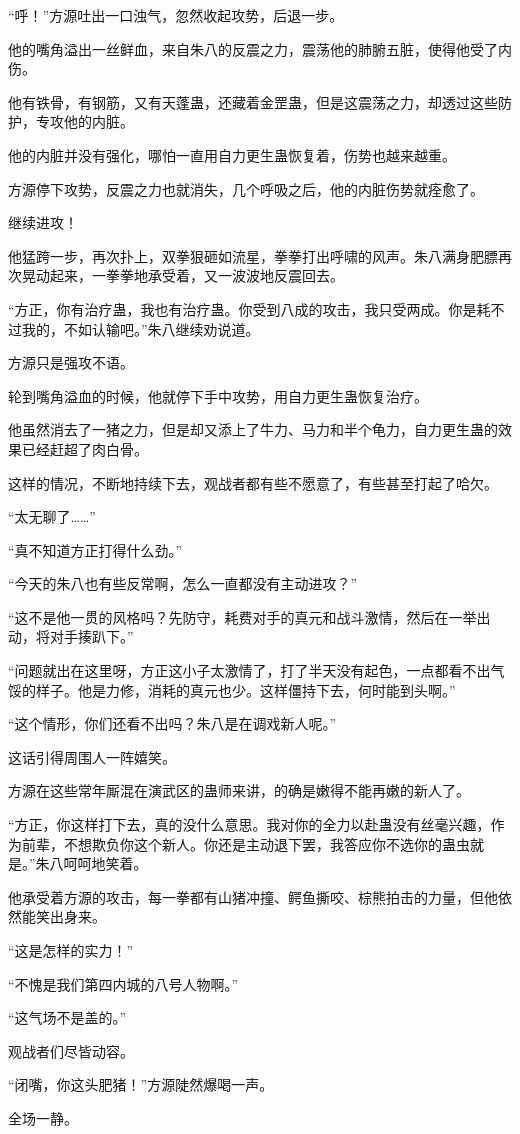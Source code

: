 \begin{this_body}
“呼！”方源吐出一口浊气，忽然收起攻势，后退一步。

他的嘴角溢出一丝鲜血，来自朱八的反震之力，震荡他的肺腑五脏，使得他受了内伤。

他有铁骨，有钢筋，又有天蓬蛊，还藏着金罡蛊，但是这震荡之力，却透过这些防护，专攻他的内脏。

他的内脏并没有强化，哪怕一直用自力更生蛊恢复着，伤势也越来越重。

方源停下攻势，反震之力也就消失，几个呼吸之后，他的内脏伤势就痊愈了。

继续进攻！

他猛跨一步，再次扑上，双拳狠砸如流星，拳拳打出呼啸的风声。朱八满身肥膘再次晃动起来，一拳拳地承受着，又一波波地反震回去。

“方正，你有治疗蛊，我也有治疗蛊。你受到八成的攻击，我只受两成。你是耗不过我的，不如认输吧。”朱八继续劝说道。

方源只是强攻不语。

轮到嘴角溢血的时候，他就停下手中攻势，用自力更生蛊恢复治疗。

他虽然消去了一猪之力，但是却又添上了牛力、马力和半个龟力，自力更生蛊的效果已经赶超了肉白骨。

这样的情况，不断地持续下去，观战者都有些不愿意了，有些甚至打起了哈欠。

“太无聊了……”

“真不知道方正打得什么劲。”

“今天的朱八也有些反常啊，怎么一直都没有主动进攻？”

“这不是他一贯的风格吗？先防守，耗费对手的真元和战斗激情，然后在一举出动，将对手揍趴下。”

“问题就出在这里呀，方正这小子太激情了，打了半天没有起色，一点都看不出气馁的样子。他是力修，消耗的真元也少。这样僵持下去，何时能到头啊。”

“这个情形，你们还看不出吗？朱八是在调戏新人呢。”

这话引得周围人一阵嬉笑。

方源在这些常年厮混在演武区的蛊师来讲，的确是嫩得不能再嫩的新人了。

“方正，你这样打下去，真的没什么意思。我对你的全力以赴蛊没有丝毫兴趣，作为前辈，不想欺负你这个新人。你还是主动退下罢，我答应你不选你的蛊虫就是。”朱八呵呵地笑着。

他承受着方源的攻击，每一拳都有山猪冲撞、鳄鱼撕咬、棕熊拍击的力量，但他依然能笑出身来。

“这是怎样的实力！”

“不愧是我们第四内城的八号人物啊。”

“这气场不是盖的。”

观战者们尽皆动容。

“闭嘴，你这头肥猪！”方源陡然爆喝一声。

全场一静。

\end{this_body}

